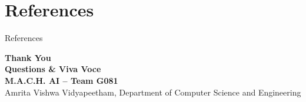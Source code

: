 \documentclass[aspectratio=169, 11pt]{beamer}
\begin{document}
\section{References}
\nocite{gemma2026technical, embeddinggemma2025, edge2024graphrag, faysse2024colpali, es2024ragas, chen2024bgem3, gao2023rag, sitaram2022curriculum}
\begin{frame}{References}
    
    
\end{frame}

\begin{frame}
    \centering
    \vspace{0.4cm}
    {\Huge \textbf{\textcolor{amritaMaroon}{Thank You}}} \\[0.4cm]
    {\large \textbf{Questions \& Viva Voce}} \\[0.3cm]
    {\footnotesize \textbf{M.A.C.H. AI -- Team G081}} \\
    {\scriptsize Amrita Vishwa Vidyapeetham, Department of Computer Science and Engineering}
\end{frame}
\end{document}
